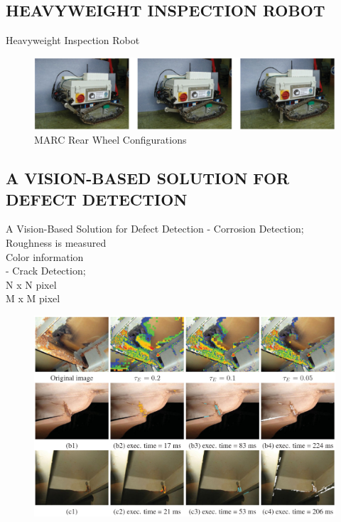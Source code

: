 \documentclass{beamer}
\begin{document}
        \subsection{HEAVYWEIGHT INSPECTION ROBOT}

            \begin{frame}{Heavyweight Inspection Robot}
                 
                \begin{figure}[htb]
                    \centering
                    \includegraphics[scale=0.16]{figuras/MARC_rear_wheel_configurations.png}                   
                    \label{}
                    MARC Rear Wheel Configurations
                \end{figure}           
            \end{frame}            

        \subsection{A VISION-BASED SOLUTION FOR DEFECT DETECTION}
            \begin{frame}{A Vision-Based Solution for Defect Detection}
                - Corrosion Detection; \\
                    Roughness is measured \\
                    Color information \\
                - Crack Detection; \\
                    N x N pixel \\
                    M x M pixel \\ 
                \begin{figure}[htb]
                    \hfill \includegraphics[scale=0.13]{figuras/corroded_aread_detected.png}                   
                    \label{}
                \end{figure}  
            \end{frame}        
\end{document}
